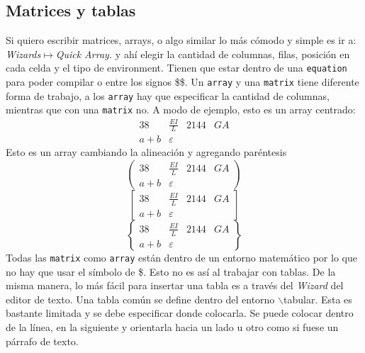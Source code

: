 \documentclass[a4paper,12pt]{article} %
\begin{document}
\subsection{Matrices y tablas}
	 Si quiero escribir matrices, arrays, o algo similar lo más cómodo y simple es ir a: \textit{Wizards$\mapsto$Quick Array.} y ahí elegir la cantidad de columnas, filas, posición en cada celda y el tipo de environment. Tienen que estar dentro de una \verb|equation| para poder compilar o entre los signos \$\$. Un \verb|array| y una \verb|matrix| tiene diferente forma de trabajo, a los \verb|array| hay que especificar la cantidad de columnas, mientras que con una \verb|matrix| no. A modo de ejemplo, esto es un array centrado:
	\begin{equation*}
	\begin{array}{cccc}
	38 & \frac{EI}{L} & 2144 & GA\\ 
	a+b & \varepsilon & &
	\end{array} 
	\end{equation*}
	Esto es un array cambiando la alineación y agregando paréntesis
	\begin{equation*}
	\left( \begin{array}{rclc}
	38 & \frac{EI}{L} & 2144 & GA\\ 
	a+b & \varepsilon & &
	\end{array} \right) 
	\end{equation*}
	\begin{equation*}
	\left[  \begin{array}{rclc}
	38 & \frac{EI}{L} & 2144 & GA\\ 
	a+b & \varepsilon & &
	\end{array} \right]  
	\end{equation*}
	\begin{equation*}
	\left\lbrace  \begin{array}{rclc}
	38 & \frac{EI}{L} & 2144 & GA\\ 
	a+b & \varepsilon & &
	\end{array} \right\rbrace  
	\end{equation*}
	Todas las \verb|matrix| como \verb|array| están dentro de un entorno matemático por lo que no hay que usar el símbolo de \$. Esto no es así al trabajar con tablas. De la misma manera, lo más fácil para insertar una tabla es a través del \textit{Wizard} del editor de texto. Una tabla común se define dentro del entorno $\backslash$tabular. Esta es bastante limitada y se debe especificar donde colocarla. Se puede colocar dentro de la línea, en la siguiente y orientarla hacia un lado u otro como si fuese un párrafo de texto.
\end{document}
